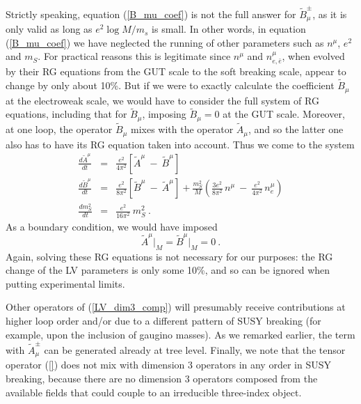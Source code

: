 \documentclass[paper,12pt]{revtex4}
\begin{document}
	Strictly speaking, equation (\ref{B_mu_coef}) is not the full answer for
	$ \widetilde{B}^\pm_\mu $,
	as it is only valid as long as $ e^2 \log M/m_s $ is small. 
	In other words, in equation (\ref{B_mu_coef}) we have neglected the running of
	other parameters such as $ n^\mu $, $ e^2 $ and $ m_S $.
	For practical reasons this is legitimate since $ n^\mu $ and $ n_{e,\bar{e}}^\mu $,
	when evolved by their RG equations from the GUT scale to the soft breaking scale,
	appear to change by only about 10\%. 
	But if we were to exactly calculate the coefficient 
$ \widetilde{B}_\mu $ at the electroweak
	scale, we would have to consider the full system of RG equations, including that
	for $ \widetilde{B}_\mu $, imposing $ \widetilde{B}_\mu  = 0 $ at the 
	GUT scale.
	Moreover, at one loop, the operator $ \widetilde{B}_\mu $ mixes with the operator
$ \widetilde{A}_\mu $, and so the latter one also has to have its RG equation taken into
	account.
	Thus we come to the system
\begin{eqnarray}
\label{RG_AB}
\nonumber
	\frac{d \widetilde{A}^\mu}
                 {dt}               & = &
	\frac{e^2}{4\pi^2}  \left [    \widetilde{A}^\mu  ~-~ \widetilde{B}^\mu  \right ]
	\\
	\frac{d \widetilde{B}^\mu}
                 {dt}               & = &
	\frac{e^2}{8\pi^2}  \left [    \widetilde{B}^\mu  ~-~ \widetilde{A}^\mu  \right ] 
	+
	\frac{m_S^2}{M}
	\left (
		\frac{3e^2}
	            {8\pi^2}\, n^\mu 
		~-~
		\frac{e^2}
		    {4\pi^2}\, n_e^\mu 
	\right )
	\\
\nonumber
	\frac{d m_S^2}
               {dt}                 & = &
	\frac{e^2}{16\pi^2}~ m_S^2~.
\end{eqnarray}
	As a boundary condition, we would have imposed 
\[
	\widetilde{A}^\mu \Bigr|_M = \widetilde{B}^\mu \Bigr|_M = 0~.
\]	
	Again, solving these RG equations is not necessary for our purposes: the RG change of 
	the LV parameters
	is only some 10\%, and so can be ignored when putting experimental limits.

Other operators of (\ref{LV_dim3_comp}) will presumably receive contributions at higher loop order
and/or due to a different pattern of SUSY breaking (for example, upon the inclusion of gaugino masses). 
        As we remarked earlier, the term with $ \widetilde{A}^\pm_\mu $ can be generated already 
      at tree level. Finally, we note that the tensor operator (\ref{}) does not mix with 
      dimension 3 operators in any order in SUSY breaking, because there are no dimension 3 operators 
      composed from the available fields that could couple to an irreducible three-index object.  
\end{document}
